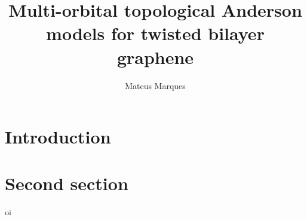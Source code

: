 \documentclass[a4paper,12pt]{book}
\title{Multi-orbital topological Anderson models for twisted bilayer graphene}
\author{Mateus Marques}
\date{ }
\begin{document}
\maketitle

\chapter{Introduction}



\chapter{Second section}

oi

%
\end{document}
